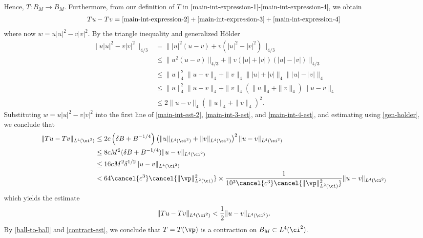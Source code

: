 %
%
Hence, $T: B_M \to B_M$. Furthermore, from our definition of $T$ in 
\eqref{main-int-expression-1}-\eqref{main-int-expression-4}, we obtain
%
%
\begin{equation*}
	\begin{split}
		Tu - Tv = \eqref{main-int-expression-2} + 
		\eqref{main-int-expression-3} + \eqref{main-int-expression-4}
	\end{split}
\end{equation*}
%
%
where now $w = u|u|^2 - v|v|^2$. By the triangle inequality and generalized
H\"{o}lder
%
%
\begin{equation}
	\label{gen-holder}
	\begin{split}
		\|u |u|^2 - v |v|^2\|_{4/3}
		& = \| |u|^2\left( u -v \right) + v\left( |u|^2 - |v|^2 
		\right)\|_{4/3}
		\\
		& \le \|u^2\left( u -v \right)\|_{4/3} + \|v\left( |u| + |v| 
		\right)\left( |u| - |v| \right) \|_{4/3}
		\\
		& \le \|u\|_4^2 \|u -v \|_4 + \|v\|_4  \| |u| + |v| \|_4 
		\| |u| - |v |\|_4 
		\\
		& \le \|u \|_4^2 \|u -v\|_4 + \|v\|_4\left( \|u\|_4 + \|v\|_4 
		\right) \|u -v \|_4
		\\
		& \le 2 \|u -v \|_4 \left(  \|u\|_4 + \|v\|_4 \right)^2.
	\end{split}
\end{equation}
%
%
Substituting $w = u|u|^2 - v|v|^2$ into the first line of \eqref{main-int-est-2}, 
\eqref{main-int-3-est}, and \eqref{main-int-4-est}, and estimating using  
\eqref{gen-holder}, we conclude that
%
%
\begin{equation*}
	\begin{split}
		\|Tu - Tv\|_{L^4(\ci^2)}
		& \le 2c\left( \delta B + B^{-1/4} 
		\right)\left( \|u\|_{L^4(\ci^2)} +
		\|v\|_{L^4(\ci^2)}\right)^2 \|u -v \|_{L^4(\ci^2)}
		\\
		& \le 8 c M^2(\delta B + B^{-1/4}) \|u - v\|_{L^4(\ci^2)}
		\\
		& \le 16cM^2 \delta^{1/2} \|u-v\|_{L^4(\ci^2)}
		\\
		& < 64 \cancel{c^3} \cancel{\|\vp\|_{L^2(\ci)}^2}
		\times \frac{1}{10^3 \cancel{c^3} \cancel{\|\vp\|_{L^2(\ci)}^2}}
		\|u-v\|_{L^4(\ci^2)}
	\end{split}
\end{equation*}
%
%
which yields the estimate
%
%
\begin{equation}
	\label{contract-est}
	\begin{split}
		\|Tu - Tv\|_{L^4(\ci^2)} < \frac{1}{2} \|u -v \|_{L^4(\ci^2)}.
	\end{split}
\end{equation}
%
%
By \eqref{ball-to-ball} and \eqref{contract-est}, we conclude that
$T = T(\vp)$ is a contraction on $B_M \subset L^4(\ci^2)$. 
%
%
%
